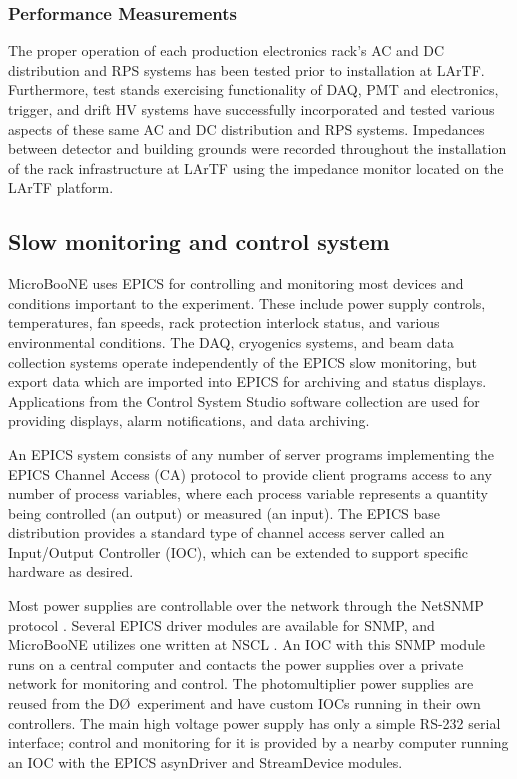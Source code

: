 \subsubsection{Performance Measurements}

The proper operation of each production electronics rack's AC and DC distribution and RPS systems has been tested prior to installation at LArTF.  Furthermore, test stands exercising functionality of DAQ, PMT and \lartpc electronics, trigger, and drift HV systems have successfully incorporated and tested various aspects of these same AC and DC distribution and RPS systems.  Impedances between detector and building grounds were recorded throughout the installation of the rack infrastructure at LArTF using the impedance monitor located on the LArTF platform.  %



\subsection{Slow monitoring and control system}

MicroBooNE uses EPICS for controlling and monitoring most devices and conditions important to the experiment.  These include power supply controls, temperatures, fan speeds, rack protection interlock status, and various environmental conditions.  The DAQ, cryogenics systems, and beam data collection systems operate independently of the EPICS slow monitoring, but export data which are imported into EPICS for archiving and status displays.  Applications from the Control System Studio software collection \cite{ControlSystemStudio} are used for providing displays, alarm notifications, and data archiving.

An EPICS system consists of any number of server programs implementing the EPICS Channel Access (CA) protocol \cite{EPICS_CAP_Spec} to provide client programs access to any number of process variables, where each process variable represents a quantity being controlled (an output) or measured (an input).  The EPICS base distribution provides a standard type of channel access server called an Input/Output Controller (IOC), which can be extended to support specific hardware as desired.

Most power supplies are controllable over the network through the NetSNMP protocol \cite{NetSNMP}.  Several EPICS driver modules are available for SNMP, and MicroBooNE utilizes one written at NSCL \cite{devSNMP}.  An IOC with this SNMP module runs on a central computer and contacts the power supplies over a private network for monitoring and control.  The photomultiplier power supplies are reused from the D\O\  experiment and have custom IOCs running in their own controllers.  The main high voltage power supply has only a simple RS-232 serial interface; control and monitoring for it is provided by a nearby computer running an IOC with the EPICS asynDriver \cite{asynDriver} and StreamDevice \cite{StreamDevice} modules.

